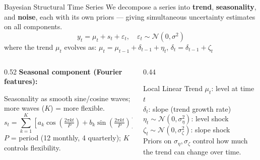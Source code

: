 \documentclass[aspectratio=169, 11pt]{beamer}
\begin{document}
\begin{frame}{Bayesian Structural Time Series}
  \small We decompose a series into \textbf{trend}, \textbf{seasonality}, and \textbf{noise},
  each with its own priors --- giving simultaneous uncertainty estimates on all components.
  \[
    y_t = \mu_t + s_t + \varepsilon_t, \quad \varepsilon_t \sim \mathcal{N}(0, \sigma^2)
  \]
  \vspace{-0.3cm}
  where the trend $\mu_t$ evolves as:
  $\mu_t = \mu_{t-1} + \delta_{t-1} + \eta_t$, \quad $\delta_t = \delta_{t-1} + \zeta_t$
  \begin{columns}[T]
    \begin{column}{0.52\textwidth}
      \textbf{Seasonal component (Fourier features):}

      \small Seasonality as smooth sine/cosine waves; more waves ($K$) = more flexible.
      \[
        s_t = \sum_{k=1}^{K} \left[a_k \cos\!\left(\tfrac{2\pi k t}{P}\right) + b_k \sin\!\left(\tfrac{2\pi k t}{P}\right)\right]
      \]
      \footnotesize $P$ = period (12 monthly, 4 quarterly); $K$ controls flexibility.
    \end{column}
    \begin{column}{0.44\textwidth}
      \begin{definitionbox}{Local Linear Trend}
        \small
        $\mu_t$: level at time $t$\\
        $\delta_t$: slope (trend growth rate)\\
        $\eta_t \sim \mathcal{N}(0, \sigma_\eta^2)$: level shock\\
        $\zeta_t \sim \mathcal{N}(0, \sigma_\zeta^2)$: slope shock\\[2pt]
        Priors on $\sigma_\eta, \sigma_\zeta$ control how much
        the trend can change over time.
      \end{definitionbox}
    \end{column}
  \end{columns}
\end{frame}
\end{document}
